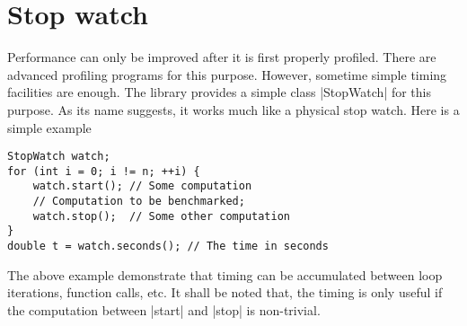 \section{Stop watch}
\label{sec:Stop watch}

Performance can only be improved after it is first properly profiled. There are
advanced profiling programs for this purpose. However, sometime simple timing
facilities are enough. The library provides a simple class |StopWatch| for this
purpose. As its name suggests, it works much like a physical stop watch. Here
is a simple example
\begin{verbatim}
StopWatch watch;
for (int i = 0; i != n; ++i) {
    watch.start(); // Some computation
    // Computation to be benchmarked;
    watch.stop();  // Some other computation
}
double t = watch.seconds(); // The time in seconds
\end{verbatim}
The above example demonstrate that timing can be accumulated between loop
iterations, function calls, etc. It shall be noted that, the timing is only
useful if the computation between |start| and |stop| is non-trivial.
